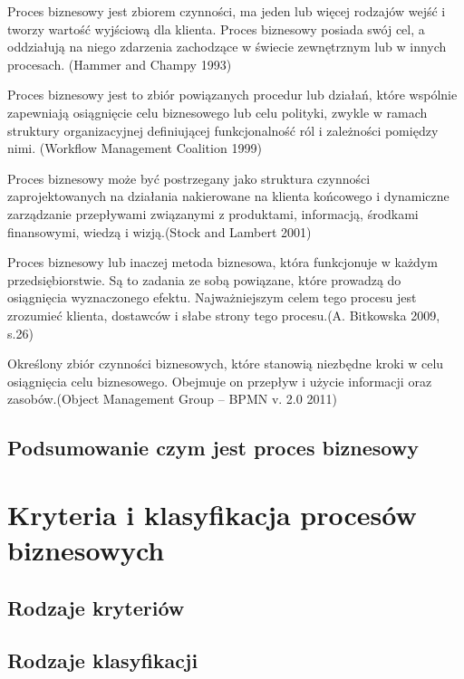 \documentclass[a4paper, 12pt]{article}
\begin{document}
\hspace*{1.5 cm}Proces biznesowy jest zbiorem czynności, ma jeden lub więcej rodzajów wejść i tworzy wartość wyjściową dla klienta. Proces biznesowy posiada swój cel, a oddziałują na niego zdarzenia zachodzące w świecie zewnętrznym lub w innych procesach.
(Hammer and Champy 1993)

\hspace*{1.5 cm} Proces biznesowy jest to zbiór powiązanych procedur lub działań, które wspólnie zapewniają osiągnięcie celu biznesowego lub celu polityki, zwykle w ramach struktury organizacyjnej definiującej funkcjonalność ról i zależności pomiędzy nimi. (Workflow Management Coalition 1999) 

\hspace*{1.5 cm}Proces biznesowy może być postrzegany jako struktura czynności zaprojektowanych na działania nakierowane na klienta końcowego i dynamiczne zarządzanie przepływami związanymi z produktami, informacją, środkami finansowymi, wiedzą i wizją.(Stock and Lambert 2001)        

\hspace*{1.5 cm}Proces biznesowy lub inaczej metoda biznesowa, która funkcjonuje w każdym przedsiębiorstwie. Są to zadania ze sobą powiązane, które prowadzą do osiągnięcia wyznaczonego efektu. Najważniejszym celem tego procesu jest zrozumieć klienta, dostawców i słabe strony tego procesu.(A. Bitkowska 2009, s.26)

\hspace*{1.5 cm}Określony zbiór czynności biznesowych, które stanowią niezbędne kroki w celu osiągnięcia celu biznesowego. Obejmuje on przepływ i użycie informacji oraz zasobów.(Object Management Group – BPMN v. 2.0 2011) 
\subsection{Podsumowanie czym jest proces biznesowy} 

\section{Kryteria i klasyfikacja procesów biznesowych}
\subsection{Rodzaje kryteriów}
\subsection{Rodzaje klasyfikacji}
\end{document}
